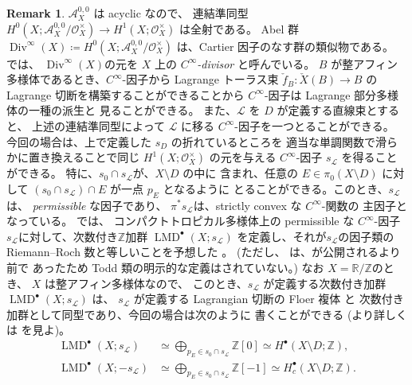 \documentclass[a4paper,dvipdfmx,reqno,12pt]{amsart}
\theoremstyle{definition}
\newtheorem{remark}[theorem]{Remark}
\newcommand{\deq}{\coloneqq}
\newcommand{\opn}[1]{\operatorname{#1}}
\numberwithin{equation}{section}
\begin{document}
\begin{remark}
$\mathcal{A}^{0,0}_X$ は acyclic なので、
連結準同型
$H^{0}(X;\mathcal{A}^{0,0}_X/\mathcal{O}_X^{\times})
\to H^{1}(X;\mathcal{O}_X^{\times})$ は全射である。
Abel 群 
$\opn{Div}^{\infty}(X)\deq 
H^{0}(X;\mathcal{A}^{0,0}_X/\mathcal{O}_X^{\times})$
は、Cartier 因子のなす群の類似物である。
\cite{tsutsui2023graded} では、
$\opn{Div}^{\infty}(X)$の元を
$X$ 上の \emph{$C^{\infty}$-divisor} と呼んでいる。
$B$ が整アフィン多様体であるとき、$C^{\infty}$-因子から
Lagrange トーラス束 $\check{f}_B\colon \check{X}(B)\to B$
の Lagrange 切断を構築することができることから
$C^{\infty}$-因子は Lagrange 部分多様体の一種の派生と
見ることができる。
また、$\mathcal{L}$ を $D$ が定義する直線束とすると、
上述の連結準同型によって $\mathcal{L}$ に移る
$C^{\infty}$-因子を一つとることができる。
今回の場合は、上で定義した $s_D$ の折れているところを
適当な単調関数で滑らかに置き換えることで同じ
$H^{1}(X;\mathcal{O}_X^{\times})$ の元を与える
$C^{\infty}$-因子 $s_{\mathcal{L}}$ を得ることができる。
特に、$s_0\cap s_{\mathcal{L}}$が、$X\setminus D$ の中に
含まれ、任意の
$E\in\pi_0(X\setminus D)$ に対して
$(s_0\cap s_{\mathcal{L}})\cap E$ が一点 $p_{E}$ となるように
とることができる。このとき、$s_{\mathcal{L}}$ は、
\emph{permissible} な因子であり、
$\pi^{*}s_{\mathcal{L}}$は、strictly convex な
$C^{\infty}$-関数の
主因子となっている。
\cite{tsutsui2023graded}では、
コンパクトトロピカル多様体上の permissible な
$C^{\infty}$-因子 $s_{\mathcal{L}}$に対して、次数付き$\mathbb{Z}$加群
$\opn{LMD}^{\bullet}(X;s_{\mathcal{L}})$
を定義し、それが$s_{\mathcal{L}}$の因子類の
Riemann--Roch 数と等しいことを予想した
\cite[Conjecture 1.2]{tsutsui2023graded}。
(ただし、\cite[Conjecture 1.2]{tsutsui2023graded}
は、\cite{demedrano2023chern}が公開されるより前で
あったため Todd 類の明示的な定義はされていない。)
なお $X=\mathbb{R}/\mathbb{Z}$のとき、
$X$ は整アフィン多様体なので、
このとき、$s_{\mathcal{L}}$ が定義する次数付き加群
$\opn{LMD}^{\bullet}(X;s_{\mathcal{L}})$ は、
$s_{\mathcal{L}}$ が定義する Lagrangian 切断の
Floer 複体 \cite[Remark 13]{MR1882331} と
次数付き加群として同型であり、今回の場合は次のように
書くことができる
(より詳しくは\cite[]{tsutsui2023graded}
を見よ)。
\begin{align}
\opn{LMD}^{\bullet}(X;s_{\mathcal{L}}) &\simeq 
\bigoplus_{p_E\in s_0\cap s_{\mathcal{L}}}\mathbb{Z}[0]
\simeq H^{\bullet}(X\setminus D;\mathbb{Z}), \\
\opn{LMD}^{\bullet}(X;-s_{\mathcal{L}}) &\simeq
\bigoplus_{p_E\in s_0\cap s_{\mathcal{L}}}\mathbb{Z}[-1]
\simeq H^{\bullet}_c(X\setminus D;\mathbb{Z}).
\end{align}

\end{remark}
\end{document}
